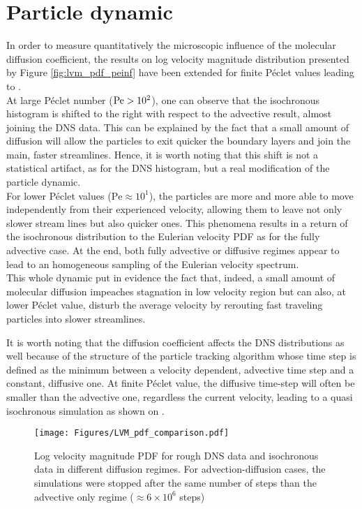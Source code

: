 \section{Particle dynamic}
In order to measure quantitatively the microscopic influence of the molecular diffusion coefficient, the results on log velocity magnitude distribution presented by Figure \ref{fig:lvm_pdf_peinf} have been extended for finite Péclet values leading to .\\
At large Péclet number ($\mathrm{Pe}>10^2$), one can observe that the isochronous histogram is shifted to the right with respect to the advective result, almost joining the DNS data.
This can be explained by the fact that a small amount of diffusion will allow the particles to exit quicker the boundary layers and join the main, faster streamlines.
Hence, it is worth noting that this shift is not a statistical artifact, as for the DNS histogram, but a real modification of the particle dynamic.\\
For lower Péclet values ($\mathrm{Pe}\approx10^1$), the particles are more and more able to move independently from their experienced velocity, allowing them to leave not only slower stream lines but also quicker ones.
This phenomena results in a return of the isochronous distribution to the Eulerian velocity PDF as for the fully advective case.
At the end, both fully advective or diffusive regimes appear to lead to an homogeneous sampling of the Eulerian velocity spectrum.\\
This whole dynamic put in evidence the fact that, indeed, a small amount of molecular diffusion impeaches stagnation in low velocity region but can also, at lower Péclet value, disturb the average velocity by rerouting fast traveling particles into slower streamlines.

It is worth noting that the diffusion coefficient affects the DNS distributions as well because of the structure of the particle tracking algorithm whose time step is defined as the minimum between a velocity dependent, advective time step and a constant, diffusive one.
At finite Péclet value, the diffusive time-step will often be smaller than the advective one, regardless the current velocity, leading to a quasi isochronous simulation as shown on .\\
\begin{figure}[h!]
	\centering
	\texttt{[image: Figures/LVM\_pdf\_comparison.pdf]}
	\caption{Log velocity magnitude PDF for rough DNS data and isochronous data in different diffusion regimes. For advection-diffusion cases, the simulations were stopped after the same number of steps than the advective only regime ($\approx6\times 10^6$ steps) }
	\label{fig:lvm_pdf_pe}
\end{figure}

